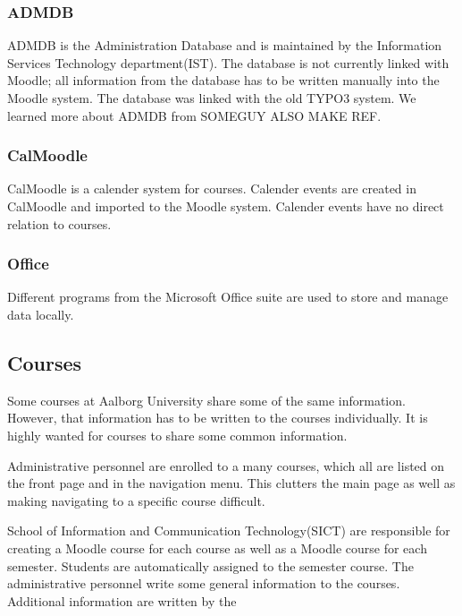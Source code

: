 \subsubsection{ADMDB}
ADMDB is the Administration Database and is maintained by the Information Services Technology department(IST).
The database is not currently linked with Moodle; all information from the database has to be written manually into the Moodle system.
The database was linked with the old TYPO3 system.
We learned more about ADMDB from SOMEGUY ALSO MAKE REF. 

\subsubsection{CalMoodle}
CalMoodle is a calender system for courses.
Calender events are created in CalMoodle and imported to the Moodle system.
Calender events have no direct relation to courses.

\subsubsection{Office}
Different programs from the Microsoft Office suite are used to store and manage data locally.




\subsection{Courses}
Some courses at Aalborg University share some of the same information.
However, that information has to be written to the courses individually.
It is highly wanted for courses to share some common information.

Administrative personnel are enrolled to a many courses, which all are listed on the front page and in the navigation menu.
This clutters the main page as well as making navigating to a specific course difficult.

School of Information and Communication Technology(SICT) are responsible for creating a Moodle course for each course as well as a Moodle course for each semester. 
Students are automatically assigned to the semester course.
The administrative personnel write some general information to the courses.
Additional information are written by the %